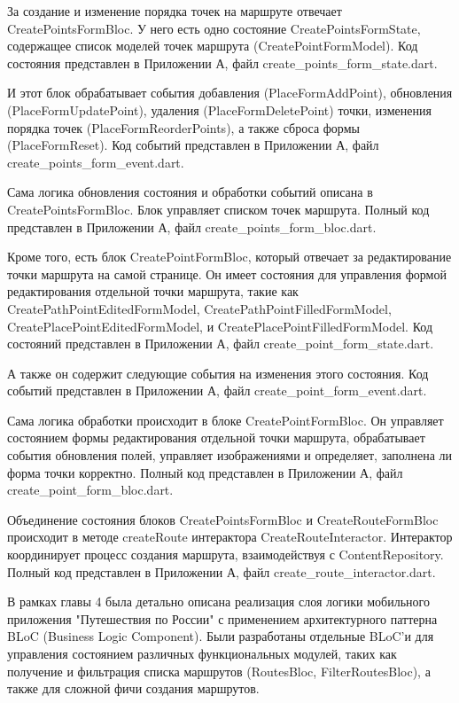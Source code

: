 За создание и изменение порядка точек на маршруте отвечает CreatePointsFormBloc. У него есть одно состояние CreatePointsFormState, содержащее список моделей точек маршрута (CreatePointFormModel). Код состояния представлен в Приложении А, файл create\_points\_form\_state.dart.

И этот блок обрабатывает события добавления (PlaceFormAddPoint), обновления (PlaceFormUpdatePoint), удаления (PlaceFormDeletePoint) точки, изменения порядка точек (PlaceFormReorderPoints), а также сброса формы (PlaceFormReset). Код событий представлен в Приложении А, файл create\_points\_form\_event.dart.

Сама логика обновления состояния и обработки событий описана в CreatePointsFormBloc. Блок управляет списком точек маршрута. Полный код представлен в Приложении А, файл create\_points\_form\_bloc.dart.

Кроме того, есть блок CreatePointFormBloc, который отвечает за редактирование точки маршрута на самой странице. Он имеет состояния для управления формой редактирования отдельной точки маршрута, такие как CreatePathPointEditedFormModel, CreatePathPointFilledFormModel, CreatePlacePointEditedFormModel, и CreatePlacePointFilledFormModel. Код состояний представлен в Приложении А, файл create\_point\_form\_state.dart.

А также он содержит следующие события на изменения этого состояния. Код событий представлен в Приложении А, файл create\_point\_form\_event.dart.

Сама логика обработки происходит в блоке CreatePointFormBloc. Он управляет состоянием формы редактирования отдельной точки маршрута, обрабатывает события обновления полей, управляет изображениями и определяет, заполнена ли форма точки корректно. Полный код представлен в Приложении А, файл create\_point\_form\_bloc.dart.

Объединение состояния блоков CreatePointsFormBloc и CreateRouteFormBloc  происходит в методе createRoute интерактора CreateRouteInteractor. Интерактор координирует процесс создания маршрута, взаимодействуя с ContentRepository. Полный код представлен в Приложении А, файл create\_route\_interactor.dart.

В рамках главы 4 была детально описана реализация слоя логики мобильного приложения "Путешествия по России" с применением архитектурного паттерна BLoC (Business Logic Component). Были разработаны отдельные BLoC'и для управления состоянием различных функциональных модулей, таких как получение и фильтрация списка маршрутов (RoutesBloc, FilterRoutesBloc), а также для сложной фичи создания маршрутов.  

